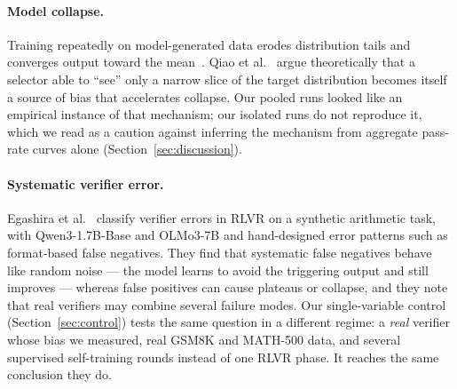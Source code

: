 \documentclass[runningheads]{llncs}
\begin{document}
\paragraph{Model collapse.}
Training repeatedly on model-generated data erodes distribution tails and
converges output toward the mean~\cite{ref_collapse}. Qiao et
al.~\cite{ref_selectionbias} argue theoretically that a selector able to
``see'' only a narrow slice of the target distribution becomes itself a
source of bias that accelerates collapse. Our pooled runs looked like an
empirical instance of that mechanism; our isolated runs do not reproduce
it, which we read as a caution against inferring the mechanism from
aggregate pass-rate curves alone (Section~\ref{sec:discussion}).

\paragraph{Systematic verifier error.}
Egashira et al.~\cite{ref_delayplateau} classify verifier errors in RLVR on a
synthetic arithmetic task, with Qwen3-1.7B-Base and OLMo3-7B and
hand-designed error patterns such as format-based false negatives. They find
that systematic false negatives behave like random noise --- the model
learns to avoid the triggering output and still improves --- whereas
false positives can cause plateaus or collapse, and they note that real
verifiers may combine several failure modes. Our single-variable control
(Section~\ref{sec:control}) tests the same question in a different regime: a
\emph{real} verifier whose bias we measured, real GSM8K and MATH-500 data,
and several supervised self-training rounds instead of one RLVR phase. It
reaches the same conclusion they do.
\end{document}
